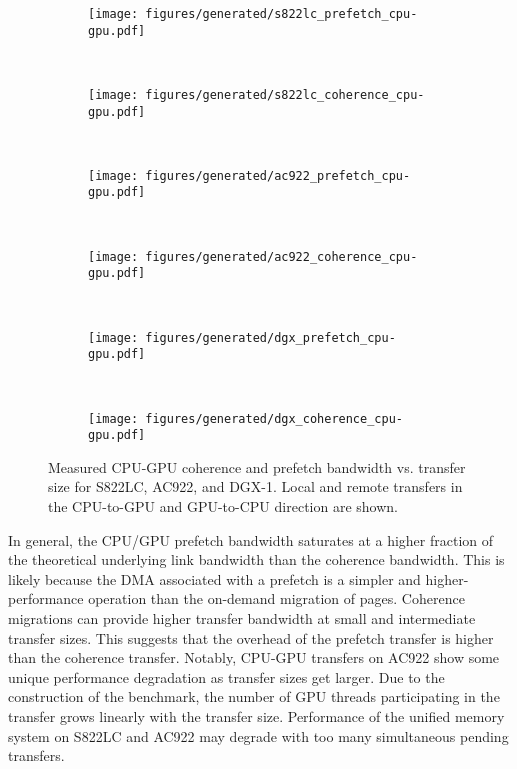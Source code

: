 \begin{figure}[H]
	\centering
	\begin{subfigure}[b]{0.45\textwidth}
		\texttt{[image: figures/generated/s822lc\_prefetch\_cpu-gpu.pdf]}
		\caption{}
		\label{fig:um-prefetch-s822lc-cpu-gpu}
	\end{subfigure}
	~
	\begin{subfigure}[b]{0.45\textwidth}
		\texttt{[image: figures/generated/s822lc\_coherence\_cpu-gpu.pdf]}
		\caption{}
		\label{fig:um-coherence-s822lc-cpu-gpu}
	\end{subfigure}
	\\
	\begin{subfigure}[b]{0.45\textwidth}
		\texttt{[image: figures/generated/ac922\_prefetch\_cpu-gpu.pdf]}
		\caption{}
		\label{fig:um-prefetch-ac922-cpu-gpu}
	\end{subfigure}
	~
	\begin{subfigure}[b]{0.45\textwidth}
		\texttt{[image: figures/generated/ac922\_coherence\_cpu-gpu.pdf]}
		\caption{}
		\label{fig:um-coherence-ac922-cpu-gpu}
	\end{subfigure}
	\\
	\begin{subfigure}[b]{0.45\textwidth}
		\texttt{[image: figures/generated/dgx\_prefetch\_cpu-gpu.pdf]}
		\caption{}
		\label{fig:um-prefetch-dgx-cpu-gpu}
	\end{subfigure}
	~
	\begin{subfigure}[b]{0.45\textwidth}
		\texttt{[image: figures/generated/dgx\_coherence\_cpu-gpu.pdf]}
		\caption{}
		\label{fig:um-coherence-dgx-cpu-gpu}
	\end{subfigure}
	\caption[CPU/GPU Coherence and Prefetch Bandwidth]{
		Measured CPU-GPU coherence and prefetch bandwidth vs. transfer size  for S822LC, AC922, and DGX-1.
		Local and remote transfers in the CPU-to-GPU and GPU-to-CPU direction are shown.
	}
	\label{fig:um-cpu-gpu}
\end{figure}


In general, the CPU/GPU prefetch bandwidth saturates at a higher fraction of the theoretical underlying link bandwidth than the coherence bandwidth.
This is likely because the DMA associated with a prefetch is a simpler and higher-performance operation than the on-demand migration of pages.
Coherence migrations can provide higher transfer bandwidth at small and intermediate transfer sizes.
This suggests that the overhead of the prefetch transfer is higher than the coherence transfer.
Notably, CPU-GPU transfers on AC922 show some unique performance degradation as transfer sizes get larger.
Due to the construction of the benchmark, the number of GPU threads participating in the transfer grows linearly with the transfer size.
Performance of the unified memory system on S822LC and AC922 may degrade with too many simultaneous pending transfers.

